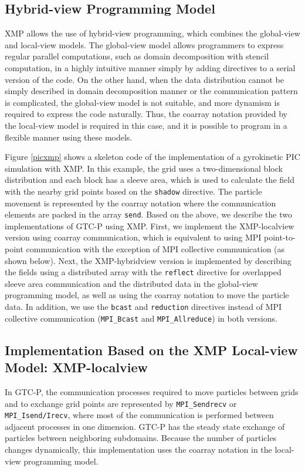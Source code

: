 \subsection{Hybrid-view Programming Model}
XMP allows the use of hybrid-view programming, which combines the global-view and local-view models. The global-view model allows programmers to express regular parallel computations, such as domain decomposition with stencil computation, in a highly intuitive manner simply by adding directives to a serial version of the code. On the other hand, when the data distribution cannot be simply described in domain decomposition manner or the communication pattern is complicated, the global-view model is not suitable, and more dynamism is required to express the code naturally. Thus, the coarray notation provided by the local-view model is required in this case, and it is possible to program in a flexible manner using these models. 

Figure \ref{picxmp} shows a skeleton code of the implementation of a gyrokinetic PIC simulation with XMP. In this example, the grid uses a two-dimensional block distribution and each block has a sleeve area, which is used to calculate the field with the nearby grid points based on the {\tt shadow} directive. The particle movement is represented by the coarray notation where the communication elements are packed in the array {\tt send}. Based on the above, we describe the two implementations of GTC-P using XMP. First, we implement the XMP-localview version using coarray communication, which is equivalent to using MPI point-to-point communication with the exception of MPI collective communication (as shown below). Next, the XMP-hybridview version is implemented by describing the fields using a distributed array with the {\tt reflect} directive for overlapped sleeve area communication and the distributed data in the global-view programming model, as well as using the coarray notation to move the particle data. In addition, we use the {\tt bcast} and {\tt reduction} directives instead of MPI collective communication ({\tt MPI\_Bcast} and {\tt MPI\_Allreduce}) in both versions.

\subsection{Implementation Based on the XMP Local-view Model: XMP-localview}
In GTC-P, the communication processes required to move particles between grids and to exchange grid points are represented by {\tt MPI\_Sendrecv} or {\tt MPI\_Isend/Irecv}, where most of the communication is performed between adjacent processes in one dimension. GTC-P has the steady state exchange of particles between neighboring subdomains. Because the number of particles changes dynamically, this implementation uses the coarray notation in the local-view programming model. 

